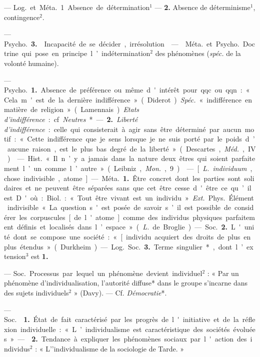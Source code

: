 \begin{itemize}[leftmargin=1cm, label=, itemsep=1pt]
 — \si{Log.} et \si{Méta.} 1. Absence de détermination$^1$
—  {\bf 2.} Absence de déterminisme$^1$, contingence$^2$.

— \si{Psycho.} {\bf 3.}  Incapacité de se décider,
irrésolution.

 —  \si{Méta.} et \si{Psycho.} Doctrine qui
pose en principe l’indétermination$^2$ des phénomènes ({\it spéc.} de la
volonté humaine).

 — \si{Psycho.} {\bf 1.} Absence de préférence ou même
d'intérêt pour qqc. ou qqn. : « Cela m'est de la dernière
indifférence » (Diderot). {\it Spéc.} « indifférence en matière de
religion » (Lamennais). {\it Etats d’indifférence} : cf. {\it Neutres}*. —
{\bf 2.} {\it Liberté d'indifférence} : celle qui consisterait à agir sans
être déterminé par aucun motif : « Cette indifférence que je sens lorsque je
ne suis porté... par le poids d’aucune raison, est le plus bas degré de la
liberté » (Descartes, \si{{\it Méd.}}, IV).

 — \si{Hist.} « Il n’y a jamais dans la
nature deux
êtres qui soient parfaitement l’un comme l’autre » (Leibniz, {\it Mon.}, 9).

 — [{\it L.} {\it individuum}, chose indivisible, atome] —
\si{Méta.} {\bf 1.} Être concret dont les parties sont solidaires et ne
peuvent être séparées sans que cet être cesse d'être ce qu’il est. D'où :
\si{Biol.} : « Tout être vivant est un individu ». {\it Ext.} \si{Phys.}
Élément indivisible « La question s'est posée de savoir s’il est possible de
considérer les corpuscules [de l'atome] comme des individus physiques
parfaitement définis et localisés dans l’espace » ({\it L.} de Broglie).

— \si{Soc.} {\bf 2.} L'unité dont se compose une société : « [individu
acquiert des droits de plus en plus étendus » (Durkheim).

— \si{Log.} \si{Soc.} {\bf 3.} Terme singulier*, dont l’extension$^3$ est
{\bf 1.}

 — \si{Soc.} Processus par lequel un phénomène devient
individuel$^2$ : « Par un phénomène d’individualisation, l'autorité diffuse*
dans le groupe s’incarne dans des sujets individuels$^2$ » (Davy). — Cf.
{\it Démocratie}*.

 — \si{Soc.}  {\bf 1.} État de fait
caractérisé par les progrès de l'initiative et de la réflexion individuelle :
« L’individualisme est caractéristique des sociétés évoluées. » —
 {\bf 2.} Tendance à expliquer les phénomènes sociaux par
l'action des individus$^2$ : « L'’individualisme de la sociologie de Tarde. »


\end{itemize}
